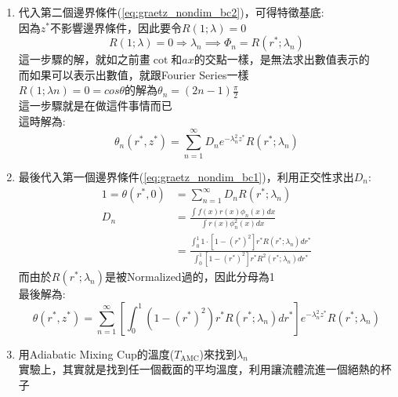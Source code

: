 \documentclass[../main.tex]{subfiles}
\begin{document}
\begin{itemize}
\begin{enumerate}
\begin{equation}
      \theta(r^\ast, z^\ast) = D e^{-\lambda^2 z^\ast} R(r^\ast; \lambda)
    \end{equation}
    \item 代入第二個邊界條件(\ref{eq:graetz_nondim_bc2})，可得特徵基底:\\
    因為$z^\ast$不影響邊界條件，因此要令$R(1;\lambda) = 0$
    \begin{equation}
      R(1; \lambda) = 0 \Rightarrow \lambda_n\implies \Phi_n = R(r^\ast; \lambda_n)
    \end{equation}
    這一步驟的解，就如之前畫$\cot$和$ax$的交點一樣，是無法求出數值表示的\\
    而如果可以表示出數值，就跟Fourier Series一樣\\
    $R(1;\lambda n)=0=cos\theta$的解為$\theta_n = (2n-1)\frac{\pi}{2}$\\
    這一步驟就是在做這件事情而已\\
    這時解為:
    \begin{equation}
      \theta_n(r^\ast, z^\ast) = \sum_{n=1}^{\infty} D_n e^{-\lambda_n^2 z^\ast} R(r^\ast; \lambda_n)
    \end{equation}
    \item 最後代入第一個邊界條件(\ref{eq:graetz_nondim_bc1})，利用正交性求出$D_n$:
    \begin{align}
      1 = \theta(r^\ast,0) &= \sum_{n=1}^{\infty} D_n R(r^\ast; \lambda_n) \nonumber\\
      D_n&=\frac{
        \int f(x)r(x)\phi_n(x)dx
      }{\int r(x)\phi_n^2(x) dx} \nonumber\\
      &= \frac{\int_0^1 1 \cdot \left[
        1 - (r^\ast)^2
      \right] r^\ast R(r^\ast; \lambda_n) dr^\ast}{\int_0^1 \left[
        1 - (r^\ast)^2
      \right] r^\ast R^2(r^\ast; \lambda_n) dr^\ast}
    \end{align}
    而由於$R(r^\ast; \lambda_n)$是被Normalized過的，因此分母為1\\
    最後解為:
    \begin{equation}
      \boxed{\theta(r^\ast, z^\ast) = \sum_{n=1}^{\infty} \left[
        \int_0^1 \left(
          1 - (r^\ast)^2
        \right) r^\ast R(r^\ast; \lambda_n) dr^\ast
      \right] e^{-\lambda_n^2 z^\ast} R(r^\ast; \lambda_n)}
    \end{equation}
    \item 用Adiabatic Mixing Cup的溫度($T_{\text{AMC}}$)來找到$\lambda_n$ \label{sec:graetz_amc_temperature}\\
    實驗上，其實就是找到任一個截面的平均溫度，利用讓流體流進一個絕熱的杯子\\

\end{enumerate}
\end{itemize}
\end{document}
